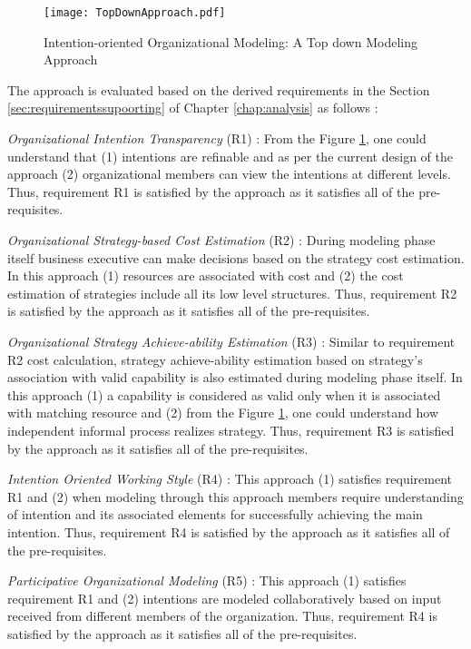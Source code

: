 \begin{figure}
	\centering
	\texttt{[image: TopDownApproach.pdf]}
	\caption{Intention-oriented Organizational Modeling: A Top down Modeling Approach}
	\label{fig:topdownapproach}
\end{figure}

The approach is evaluated based on the derived requirements in the Section \ref{sec:requirementssupoorting} of Chapter \ref{chap:analysis} as follows :

\textit{Organizational Intention Transparency} (R1) : From the Figure \ref{fig:topdownapproach}, one could understand that (1) intentions are refinable and as per the current design of the approach (2) organizational members can view the intentions at different levels. Thus, requirement R1 is satisfied by the approach as it satisfies all of the pre-requisites. 

\textit{Organizational Strategy-based Cost Estimation} (R2) : During modeling phase itself business executive can make decisions based on the strategy cost estimation. In this approach (1) resources are associated with cost and (2) the cost estimation of strategies include all its low level structures. Thus, requirement R2 is satisfied by the approach as it satisfies all of the pre-requisites. 

\textit{Organizational Strategy Achieve-ability Estimation} (R3) : Similar to requirement R2 cost calculation, strategy achieve-ability estimation based on strategy's association with valid capability is also estimated during modeling phase itself. In this approach (1) a capability is considered as valid only when it is associated with matching resource and (2) from the Figure \ref{fig:topdownapproach}, one could understand how independent informal process realizes strategy. Thus, requirement R3 is satisfied by the approach as it satisfies all of the pre-requisites.

\textit{Intention Oriented Working Style} (R4) : This approach (1) satisfies requirement R1 and (2) when modeling through this approach members require understanding of intention and its associated elements for successfully achieving the main intention. Thus, requirement R4 is satisfied by the approach as it satisfies all of the pre-requisites.

\textit{Participative Organizational Modeling} (R5) : This approach (1) satisfies requirement R1 and  (2) intentions are modeled collaboratively based on input received from different members of the organization. Thus, requirement R4 is satisfied by the approach as it satisfies all of the pre-requisites. 


